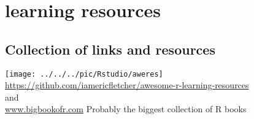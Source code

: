 \section{\R learning resources}

\subsection{Collection of links and resources}
\begin{center}
	\texttt{[image: ../../../pic/Rstudio/aweres]}\\
\webbig\url{https://github.com/iamericfletcher/awesome-r-learning-resources}\\
and\\
\webbig\url{www.bigbookofr.com} Probably the biggest collection of R books
\end{center}




